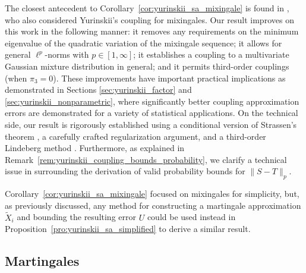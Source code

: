 The closest antecedent to Corollary~\ref{cor:yurinskii_sa_mixingale} is found in
\citet[Theorem~4]{li2020uniform}, who also considered Yurinskii's coupling for
mixingales. Our result improves on this work in the following manner: it
removes any requirements on the minimum eigenvalue of the quadratic variation
of the mixingale sequence; it allows for general $\ell^p$-norms with
$p\in[1,\infty]$; it establishes a coupling to a multivariate Gaussian
mixture distribution in general; and it permits third-order couplings
(when $\pi_3=0$). These improvements have important practical implications as
demonstrated in Sections \ref{sec:yurinskii_factor} and
\ref{sec:yurinskii_nonparametric},
where significantly better coupling approximation
errors are demonstrated for a variety of statistical applications. On the
technical side, our result is rigorously established using a conditional
version of Strassen's theorem \citep{chen2020jackknife}, a carefully crafted
regularization argument, and a third-order Lindeberg method
\citep[see][and references therein, for more discussion on the
standard second-order Lindeberg method]{chatterjee2006generalization}.
Furthermore, as explained in
Remark~\ref{rem:yurinskii_coupling_bounds_probability}, we
clarify a technical issue in \citet{li2020uniform} surrounding the derivation
of valid probability bounds for $\|S-T\|_p$.

Corollary~\ref{cor:yurinskii_sa_mixingale} focused on mixingales for
simplicity, but, as
previously discussed, any method for constructing a martingale approximation
$\tilde X_i$ and bounding the resulting error $U$ could be used instead in
Proposition~\ref{pro:yurinskii_sa_simplified} to derive a similar result.

\subsection{Martingales}
\label{sec:yurinskii_martingales}

